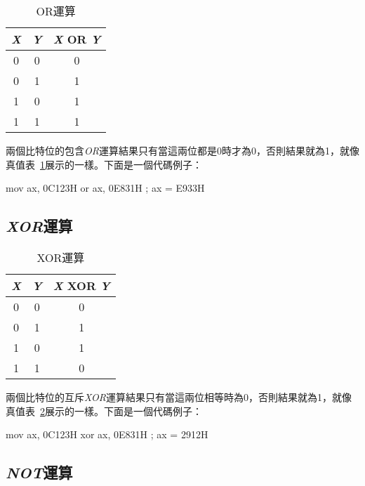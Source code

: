 \begin{table}[t]
\centering
\begin{tabular}{|c|c|c|}
\hline
\emph{X} & \emph{Y} & \emph{X} OR \emph{Y} \\
\hline \hline
0 & 0 & 0 \\
0 & 1 & 1 \\
1 & 0 & 1 \\
1 & 1 & 1 \\
\hline
\end{tabular}
\caption{OR運算\label{tab:or} }
\end{table}


兩個比特位的包含\emph{OR}運算結果只有當這兩位都是0時才為0，否則結果就為1，就像真值表~\ref{tab:or}展示的一樣。下面是一個代碼例子：

\begin{AsmCodeListing}[frame=none]
      mov    ax, 0C123H
      or     ax, 0E831H          ; ax = E933H
\end{AsmCodeListing}

\subsection{\emph{XOR}運算}

\begin{table}
\centering
\begin{tabular}{|c|c|c|}
\hline
\emph{X} & \emph{Y} & \emph{X} XOR \emph{Y} \\
\hline \hline
0 & 0 & 0 \\
0 & 1 & 1 \\
1 & 0 & 1 \\
1 & 1 & 0 \\
\hline
\end{tabular}
\caption{XOR運算 \label{tab:xor}}
\end{table}


兩個比特位的互斥\emph{XOR}運算結果只有當這兩位相等時為0，否則結果就為1，就像真值表~\ref{tab:xor}展示的一樣。下面是一個代碼例子：

\begin{AsmCodeListing}[frame=none]
      mov    ax, 0C123H
      xor    ax, 0E831H          ; ax = 2912H
\end{AsmCodeListing}

\subsection{\emph{NOT}運算}

